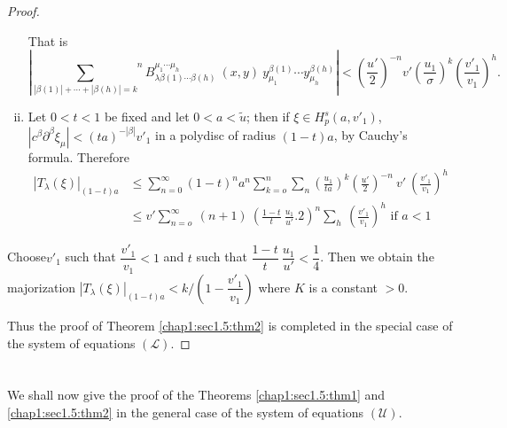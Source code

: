 \begin{proof}
\begin{enumerate}[(i)]
    That is
{\fontsize{10pt}{12pt}\selectfont
    $$
    \left| {  \sum_{| \beta(1) | + \cdots + | \beta(h) | =k}  }
    ^nB^{\mu_1 \cdots \mu_h}_{\lambda\beta(1) \cdots \beta(h)} ~ (x,
    y)  ~ y^{\beta(1) }_{\mu_1} \cdots y^{\beta(h)}_{\mu_h} \right| < \left(
    \frac{u'}{2}\right)^{-n} v' \left(\frac{u_1}{\sigma}\right)^k
    \left(\frac{v'_1}{v_1}\right)^h. 
    $$}\relax

  \item Let $0 < t < 1$ be fixed and let $0 < a < \tilde{u}$; then if
    $\xi \in H^s_p (a, v'_1)$,\break  $| c^\beta \partial^\beta \xi_\mu | <
    (ta)^{- | \beta | } v'_1$ in a polydisc of radius $(1- t)a$,  by
    Cauchy's formula. Therefore  
    \begin{align*}
      | T_\lambda (\xi) |_{(1-t)a} & \le \sum_{n=0}^\infty (1-t)^n a^n
      \sum_{k =o}^n \sum_n \left(\frac{u_1}{ta}\right)^k
      \left(\frac{u'}{2}\right)^{-n} ~
      v' ~\left(\frac{v'_1}{v_1}\right)^h\\ 
      & \le v' \sum_{n=o}^\infty ~ (n + 1) ~ \left(\frac{1-t}{t} ~
      \frac{u_1}{u'}. 2\right)^n \sum_h ~
      \left(\frac{v'_1}{v_1}\right)^h  \text{ if } a < 1 
    \end{align*}
  \end{enumerate}
  Choose\pageoriginale $v'_1$ such that $\dfrac{v'_1}{v_1} < 1$ and $t$ such that
  $\dfrac{1 - t}{t} ~ \dfrac{u_1}{u'} < \dfrac{1}{4}$. Then we obtain
  the majorization $| T_\lambda (\xi) |_{(1 -t)a} < k \Big/ \left(1 -
  \dfrac{v'_1}{v_1}\right)$ where $K$ is a constant $> 0$. 
  
  Thus the proof of Theorem \ref{chap1:sec1.5:thm2} is completed in
  the special case of the system of equations $(\mathscr{L})$. 
\end{proof}

\section{ }\label{chap1:sec1.8} %

We shall now give the proof of the Theorems \ref{chap1:sec1.5:thm1}
and \ref{chap1:sec1.5:thm2} in the general 
case of the system of equations $(\mathscr{U})$. 

